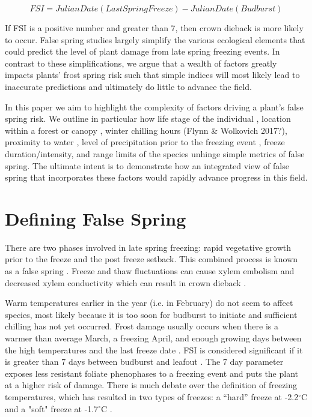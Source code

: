 \documentclass{article}\usepackage[]{graphicx}\usepackage[]{color}
\begin{document}
\[ FSI = Julian Date (Last Spring Freeze) - Julian Date (Budburst) \]

If FSI is a positive number and greater than 7, then crown dieback is more likely to occur. False spring studies largely simplify the various ecological elements that could predict the level of plant damage from late spring freezing events. In contrast to these simplifications, we argue that a wealth of factors greatly impacts plants' frost spring risk such that simple indices will most likely lead to inaccurate predictions and ultimately do little to advance the field. 

In this paper we aim to highlight the complexity of factors driving a plant's false spring risk. We outline in particular how life stage of the individual \citep{Caffarra2011}, location within a forest or canopy \citep{Augspurger2013}, winter chilling hours (Flynn \& Wolkovich 2017?), proximity to water \citep{Gu2008}, level of precipitation prior to the freezing event \citep{Anderegg2013}, freeze duration/intensity, and range limits of the species \citep{Martin2010} unhinge simple metrics of false spring. The ultimate intent is to demonstrate how an integrated view of false spring that incorporates these factors would rapidly advance progress in this field.  

\section{Defining False Spring}
There are two phases involved in late spring freezing: rapid vegetative growth prior to the freeze and the post freeze setback. This combined process is known as a false spring \citep{Gu2008}. Freeze and thaw fluctuations can cause xylem embolism and decreased xylem conductivity which can result in crown dieback \citep{Gu2008}.

Warm temperatures earlier in the year (i.e. in February) do not seem to affect species, most likely because it is too soon for budburst to initiate and sufficient chilling has not yet occurred. Frost damage usually occurs when there is a warmer than average March, a freezing April, and enough growing days between the high temperatures and the last freeze date \citep{Augspurger2013}. 
FSI is considered significant if it is greater than 7 days between budburst and leafout \citep{Peterson2014}. The 7 day parameter exposes less resistant foliate phenophases to a freezing event and puts the plant at a higher risk of damage. There is much debate over the definition of freezing temperatures, which has resulted in two types of freezes: a ``hard'' freeze at -2.2$^{\circ}$C and a "soft" freeze at -1.7$^{\circ}$C \citep{Augspurger2013, Kodra2011, Vavrus2006}.
\end{document}
